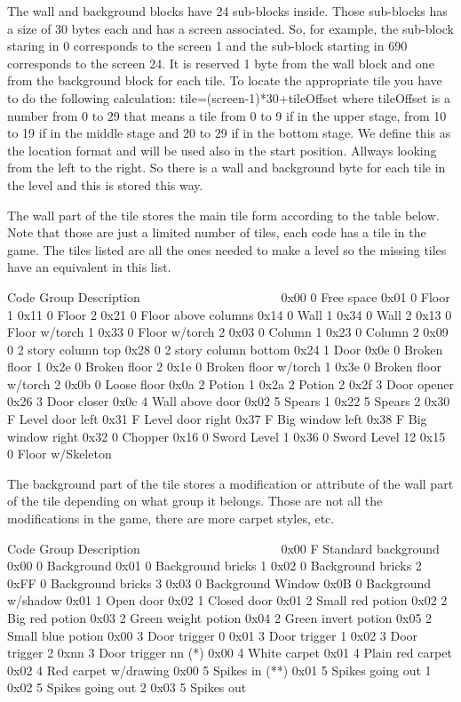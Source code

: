  The wall and background blocks have 24 sub-blocks inside. Those sub-blocks
 has a size of 30 bytes each and has a screen associated. So, for example,
 the sub-block staring in 0 corresponds to the screen 1 and the sub-block
 starting in 690 corresponds to the screen 24. 
 It is reserved 1 byte from the wall block and one from the background
 block for each tile. To locate the appropriate tile you have to do the
 following calculation: tile=(screen-1)*30+tileOffset where tileOffset is a
 number
 from 0 to 29 that means a tile from 0 to 9 if in the upper stage, from
 10 to 19 if in the middle stage and 20 to 29 if in the bottom stage.
 We define this as the location format and will be used also in the start
 position.
 Allways looking from the left to the right.
 So there is a wall and background byte for each tile in the level and this
 is stored this way.

 The wall part of the tile stores the main tile form according to the table
 below. Note that those are just a limited number of tiles, each code has a
 tile in the game. The tiles listed are all the ones needed to make a level
 so the missing tiles have an equivalent in this list.

  Code Group Description
  ~~~~ ~~~~~ ~~~~~~~~~~~
  0x00 0     Free space
  0x01 0     Floor 1
  0x11 0     Floor 2
  0x21 0     Floor above columns
  0x14 0     Wall 1
  0x34 0     Wall 2
  0x13 0     Floor w/torch 1  
  0x33 0     Floor w/torch 2     
  0x03 0     Column 1   
  0x23 0     Column 2   
  0x09 0     2 story column top
  0x28 0     2 story column bottom
  0x24 1     Door
  0x0e 0     Broken floor 1
  0x2e 0     Broken floor 2
  0x1e 0     Broken floor w/torch 1
  0x3e 0     Broken floor w/torch 2
  0x0b 0     Loose floor
  0x0a 2     Potion 1
  0x2a 2     Potion 2    
  0x2f 3     Door opener
  0x26 3     Door closer
  0x0c 4     Wall above door
  0x02 5     Spears 1
  0x22 5     Spears 2
  0x30 F     Level door left
  0x31 F     Level door right
  0x37 F     Big window left
  0x38 F     Big window right
  0x32 0     Chopper
  0x16 0     Sword Level 1
  0x36 0     Sword Level 12
  0x15 0     Floor w/Skeleton
  
 The background part of the tile stores a modification or attribute of the
 wall part of the tile depending on what group it belongs. Those are not
 all the modifications in the game, there are more carpet styles, etc.

  Code Group Description
  ~~~~ ~~~~~ ~~~~~~~~~~~
  0x00 F     Standard background
  0x00 0     Background
  0x01 0     Background bricks 1
  0x02 0     Background bricks 2
  0xFF 0     Background bricks 3
  0x03 0     Background Window
  0x0B 0     Background w/shadow
  0x01 1     Open door
  0x02 1     Closed door
  0x01 2     Small red potion
  0x02 2     Big red potion
  0x03 2     Green weight potion
  0x04 2     Green invert potion
  0x05 2     Small blue potion
  0x00 3     Door trigger 0
  0x01 3     Door trigger 1
  0x02 3     Door trigger 2
  0xnn 3     Door trigger nn (*)
  0x00 4     White carpet
  0x01 4     Plain red carpet
  0x02 4     Red carpet w/drawing
  0x00 5     Spikes in (**)
  0x01 5     Spikes going out 1
  0x02 5     Spikes going out 2 
  0x03 5     Spikes out

